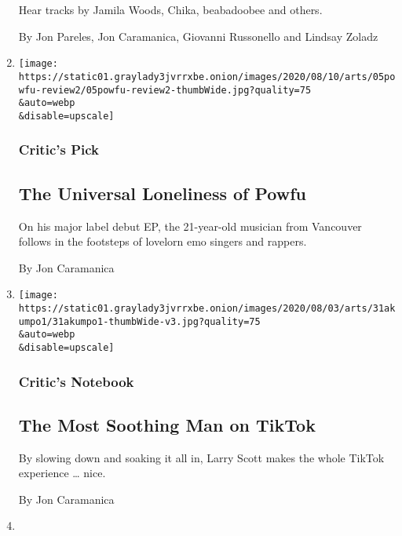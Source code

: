 \begin{enumerate}
  Hear tracks by Jamila Woods, Chika, beabadoobee and others.

  By Jon Pareles, Jon Caramanica, Giovanni Russonello and Lindsay Zoladz
\item
  \href{/2020/08/05/arts/music/powfu-poems-of-the-past-review.html}{}

  \texttt{[image: https://static01.graylady3jvrrxbe.onion/images/2020/08/10/arts/05powfu-review2/05powfu-review2-thumbWide.jpg?quality=75\\\&auto=webp\\\&disable=upscale]}

  \hypertarget{critics-pick}{%
  \subsubsection{Critic's Pick}\label{critics-pick}}

  \hypertarget{the-universal-loneliness-of-powfu}{%
  \subsection{The Universal Loneliness of
  Powfu}\label{the-universal-loneliness-of-powfu}}

  On his major label debut EP, the 21-year-old musician from Vancouver
  follows in the footsteps of lovelorn emo singers and rappers.

  By Jon Caramanica
\item
  \href{/2020/07/31/arts/larry-scott-tiktok-larryakumpo.html}{}

  \texttt{[image: https://static01.graylady3jvrrxbe.onion/images/2020/08/03/arts/31akumpo1/31akumpo1-thumbWide-v3.jpg?quality=75\\\&auto=webp\\\&disable=upscale]}

  \hypertarget{critics-notebook-1}{%
  \subsubsection{Critic's Notebook}\label{critics-notebook-1}}

  \hypertarget{the-most-soothing-man-on-tiktok}{%
  \subsection{The Most Soothing Man on
  TikTok}\label{the-most-soothing-man-on-tiktok}}

  By slowing down and soaking it all in, Larry Scott makes the whole
  TikTok experience \ldots{} nice.

  By Jon Caramanica
\item
  \href{/2020/07/31/arts/music/playlist-billie-eilish-snakehips-a-boogie.html}{}


\end{enumerate}
